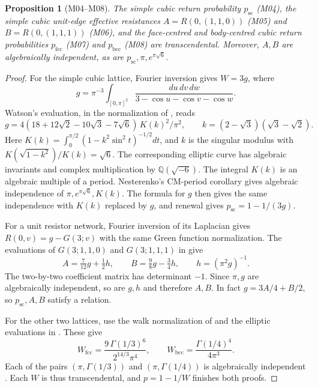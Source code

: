 \documentclass[11pt,a4paper]{article}
\newtheorem{proposition}[theorem]{Proposition}
\theoremstyle{definition}
\theoremstyle{remark}
\begin{document}
\par\hypertarget{cat-M04}{}\label{page:M04}\hypertarget{cat-M05}{}\label{page:M05}\hypertarget{cat-M06}{}\label{page:M06}\hypertarget{cat-M07}{}\label{page:M07}\hypertarget{cat-M08}{}\label{page:M08}
\begin{proposition}[M04--M08]
The simple cubic return probability $p_{\mathrm{sc}}$ (M04), the simple cubic unit-edge
effective resistances $A=R(0,(1,1,0))$ (M05) and $B=R(0,(1,1,1))$ (M06),
and the face-centred and body-centred cubic return probabilities $p_{\mathrm{fcc}}$
(M07) and $p_{\mathrm{bcc}}$ (M08) are transcendental.
Moreover, $A,B$ are algebraically independent, as are
$p_{\mathrm{sc}},\pi,e^{\pi\sqrt6}$.
\end{proposition}
\begin{proof}
For the simple cubic lattice, Fourier inversion gives $W=3g$, where
\[
 g=\pi^{-3}\int_{[0,\pi]^3}\frac{du\,dv\,dw}{3-\cos u-\cos v-\cos w}.
\]
Watson's evaluation, in the normalization of \cite{mGlasser}, reads
\[
 g=4(18+12\sqrt2-10\sqrt3-7\sqrt6)\,K(k)^2/\pi^2,
 \qquad k=(2-\sqrt3)(\sqrt3-\sqrt2).
\]
Here $K(k)=\int_0^{\pi/2}(1-k^2\sin^2t)^{-1/2}dt$, and $k$ is the
singular modulus with $K(\sqrt{1-k^2})/K(k)=\sqrt6$.
The corresponding elliptic curve has algebraic invariants and complex
multiplication by $\mathbb Q(\sqrt{-6})$. The integral $K(k)$ is an algebraic multiple
of a period. Nesterenko's CM-period corollary \cite{aNest} gives algebraic
independence of $\pi,e^{\pi\sqrt6},K(k)$.
The formula for $g$ then gives the same independence with $K(k)$ replaced by
$g$, and renewal gives $p_{\mathrm{sc}}=1-1/(3g)$.

For a unit resistor network, Fourier inversion of its Laplacian gives
$R(0,v)=g-G(3;v)$ with the same Green function normalization.
The evaluations of $G(3;1,1,0)$ and $G(3;1,1,1)$ in \cite{mGlasser} give
\[
 A=\tfrac7{12}g+\tfrac12 h,\qquad
 B=\tfrac98g-\tfrac34 h,\qquad h=(\pi^2g)^{-1}.
\]
The two-by-two coefficient matrix has determinant $-1$. Since $\pi,g$
are algebraically independent, so are $g,h$ and therefore $A,B$.
In fact $g=3A/4+B/2$, so $p_{\mathrm{sc}},A,B$ satisfy a relation.

For the other two lattices, use the walk normalization of \cite{mGutt} and the elliptic evaluations in \cite[eqs.~(17), (27)]{mGlasser}. These give
\[
 W_{\mathrm{fcc}}=\frac{9\,\Gamma(1/3)^6}{2^{14/3}\pi^4},\qquad
 W_{\mathrm{bcc}}=\frac{\Gamma(1/4)^4}{4\pi^3}.
\]
Each of the pairs $(\pi,\Gamma(1/3))$ and $(\pi,\Gamma(1/4))$ is
algebraically independent \cite{aNest}. Each $W$ is thus transcendental,
and $p=1-1/W$ finishes both proofs.
\end{proof}
\end{document}
